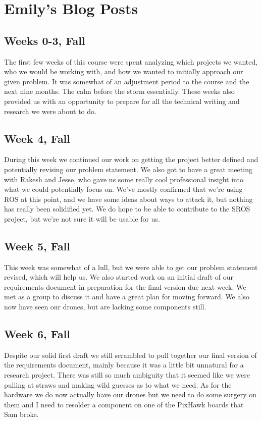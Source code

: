 \documentclass[IEEEtran,letterpaper,10pt,notitlepage,draftclsnofoot,onecolumn]{article}
\begin{document}
\begin{sloppypar}
\section{Emily's Blog Posts}
\subsection{Weeks 0-3, Fall}
The first few weeks of this course were spent analyzing which projects we wanted, who we would be working with, and how we wanted to initially approach our given problem. It was somewhat of an adjustment period to the course and the next nine months. The calm before the storm essentially. These weeks also provided us with an opportunity to prepare for all the technical writing and research we were about to do.
\subsection{Week 4, Fall}
During this week we continued our work on getting the project better defined and potentially revising our problem statement. We also got to have a great meeting with Rakesh and Jesse, who gave us some really cool professional insight into what we could potentially focus on. We've mostly confirmed that we're using ROS at this point, and we have some ideas about ways to attack it, but nothing has really been solidified yet. We do hope to be able to contribute to the SROS project, but we're not sure it will be usable for us.
\subsection{Week 5, Fall}
This week was somewhat of a lull, but we were able to get our problem statement revised, which will help us. We also started work on an initial draft of our requirements document in preparation for the final version due next week. We met as a group to discuss it and have a great plan for moving forward. We also now have seen our drones, but are lacking some components still.
\subsection{Week 6, Fall}
Despite our solid first draft we still scrambled to pull together our final version of the requirements document, mainly because it was a little bit unnatural for a research project. There was still so much ambiguity that it seemed like we were pulling at straws and making wild guesses as to what we need. As for the hardware we do now actually have our drones but we need to do some surgery on them and I need to resolder a component on one of the PixHawk boards that Sam broke.

\end{sloppypar}
\end{document}
